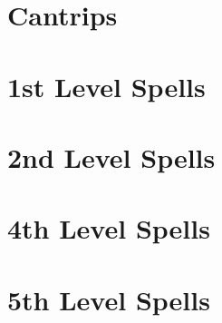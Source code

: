\documentclass[fullpage, a4paper]{article}
\begin{document}

\center
\section*{Cantrips}\smallskip
\smallskip
\smallskip
\smallskip
\smallskip
\smallskip

\newpage
\center
\section*{1st Level Spells}\smallskip
\smallskip
\smallskip
\smallskip

\newpage
\center
\section*{2nd Level Spells}\smallskip
\smallskip
\smallskip
\smallskip

\newpage
\center
\section*{4th Level Spells}\smallskip
\bigskip\bigskip\bigskip

\section*{5th Level Spells}\smallskip
\smallskip
\end{document}

